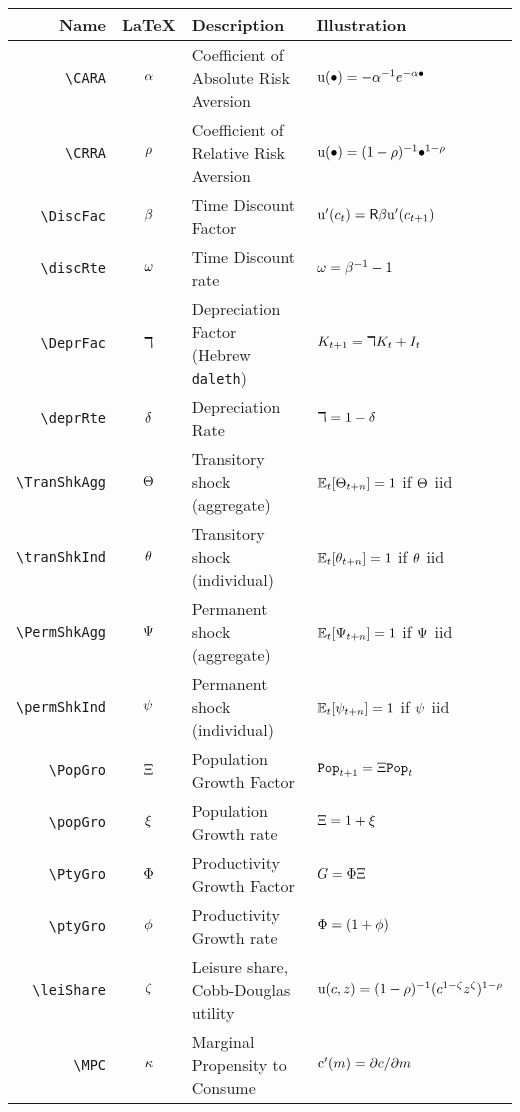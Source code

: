 \documentclass[12pt]{econtex}
\begin{document}
\begin{table}[h]
	\centering
	\begin{tabular}{|>{\ttfamily}rcll|} 		
		\hline
		 Name    & \LaTeX         & Description & Illustration
  \\ \hline
     \verb|\CARA|        & $\alpha$       & Coefficient of Absolute Risk Aversion &${\mathrm{u}}(\bullet)=-\alpha^{-1} e^{-\alpha \bullet}$
  \\ \verb|\CRRA|        & $\rho$       & Coefficient of Relative Risk Aversion & ${\mathrm{u}}(\bullet)=(1-\rho)^{-1}\bullet^{1-\rho}$ 
  \\ \verb|\DiscFac|     & $\beta$    & Time Discount Factor & ${\mathrm{u}}^{\prime}(c_{t}) =  \mathsf{R} \beta {\ensuremath{\mathrm{u}}}^{\prime}(c_{t+1})$
  \\ \verb|\discRte|     & $\omega$    & Time Discount rate & $\omega=\beta^{-1}-1$
  \\ \verb|\DeprFac|     & $\daleth$    & Depreciation Factor (Hebrew \texttt{daleth}) & ${K}_{t+1} = \daleth {K}_{t}+I_{t}$
  \\ \verb|\deprRte|     & $\delta$    & Depreciation Rate & $\daleth = 1-\delta$
  \\ \verb|\TranShkAgg|  & $\Theta$ & Transitory shock (aggregate) & $\operatorname{\mathbb{E}}_{t}[\Theta_{t+n}]=1$ if $\Theta$ iid
  \\ \verb|\tranShkInd|  & $\theta$ & Transitory shock (individual) &  $\operatorname{\mathbb{E}}_{t}[\theta_{t+n}]=1$ if $\theta$ iid
  \\ \verb|\PermShkAgg|  & $\Psi$ & Permanent shock (aggregate) & $\operatorname{\mathbb{E}}_{t}[\Psi_{t+n}]=1$ if $\Psi$ iid
  \\ \verb|\permShkInd|  & $\psi$ & Permanent shock (individual) & $\operatorname{\mathbb{E}}_{t}[\psi_{t+n}]=1$ if $\psi$ iid
  \\ \verb|\PopGro|  & $\Xi$ & Population Growth Factor & $\texttt{Pop}_{t+1} = \Xi \texttt{Pop}_{t}$
  \\ \verb|\popGro|  & $\xi$ & Population Growth rate & $\Xi = 1 + \xi$
  \\ \verb|\PtyGro|  & $\Phi$ & Productivity Growth Factor & $G = \Phi \Xi$
  \\ \verb|\ptyGro|  & $\phi$ & Productivity Growth rate & $\Phi = (1+\phi)$
  \\ \verb|\leiShare|  & $\zeta$ & Leisure share, Cobb-Douglas utility & ${\mathrm{u}}(c,z)=(1-\rho)^{-1}(c^{1-\zeta}z^{\zeta})^{1-\rho}$
  \\ \verb|\MPC|  & $\kappa$ & Marginal Propensity to Consume & $\mathrm{c}^{\prime}(m)=\partial c/\partial m$

\end{tabular}
\end{table}
\end{document}
